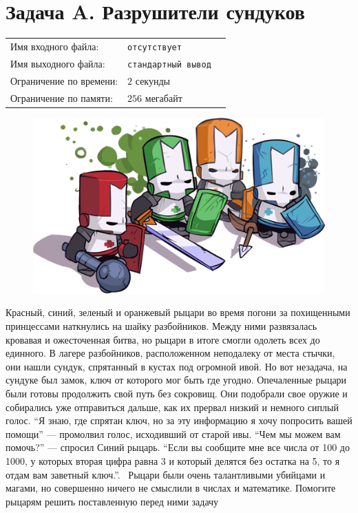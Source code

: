 \documentclass[12pt]{scrartcl}
\newcommand{\inputFile}{отсутствует}
\newcommand{\outputFile}{стандартный вывод}
\begin{document}
\singlespacing

\section*{Задача A. Разрушители сундуков}

\begin{tabularx}{\textwidth}{l l X}
    Имя входного файла: & \texttt{\inputFile} \\
    Имя выходного файла: & \texttt{\outputFile} \\
    Ограничение по времени: & $2$ секунды \\
    Ограничение по памяти: & $256$ мегабайт \\
\end{tabularx}

\begin{figure}[h]
	\centering
    \includegraphics[width=0.6\linewidth]{Crashers.png}
\end{figure}

Красный, синий, зеленый и оранжевый рыцари во время погони за похищенными принцессами наткнулись на шайку разбойников. Между ними развязалась кровавая и ожесточенная битва, но рыцари в итоге смогли одолеть всех до единного.
В лагере разбойников, расположенном неподалеку от места стычки, они нашли сундук, спрятанный в кустах под огромной ивой. Но вот незадача, на сундуке был замок, ключ от которого мог быть где угодно. 
Опечаленные рыцари были готовы продолжить свой путь без сокровищ. Они подобрали свое оружие и собирались уже отправиться дальше, как их прервал низкий и немного сиплый голос. 
``Я знаю, где спрятан ключ, но за эту информацию я хочу попросить вашей помощи'' --- промолвил голос, исходивший от старой ивы. ``Чем мы можем вам помочь?'' --- спросил Синий рыцарь. 
``Если вы сообщите мне все числа от 100 до 1000, у которых вторая цифра равна 3 и который делятся без остатка на 5, то я отдам вам заветный ключ.''. \
Рыцари были очень талантливыми убийцами и магами, но совершенно ничего не смыслили в числах и математике. Помогите рыцарям решить поставленную перед ними задачу 
\end{document}
